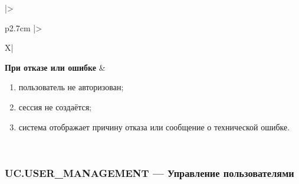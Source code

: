 \documentclass[12pt,a4paper]{article}
\begin{document}
\begin{xltabular}{\textwidth}{
			|>{\raggedright\arraybackslash}p{2.7cm}
			|>{\raggedright\arraybackslash}X|
		}
		\textbf{При отказе или ошибке} &
		\begin{enumerate}
			\item пользователь не авторизован;
			\item сессия не создаётся;
			\item система отображает причину отказа или сообщение о технической ошибке.
		\end{enumerate} \\
		\hline
		
		\end{xltabular}
		
		\label{tab:uc-auth-specification}
	
	\clearpage
	
	\subsubsection{UC.USER\_MANAGEMENT --- Управление пользователями}
	
\end{document}
